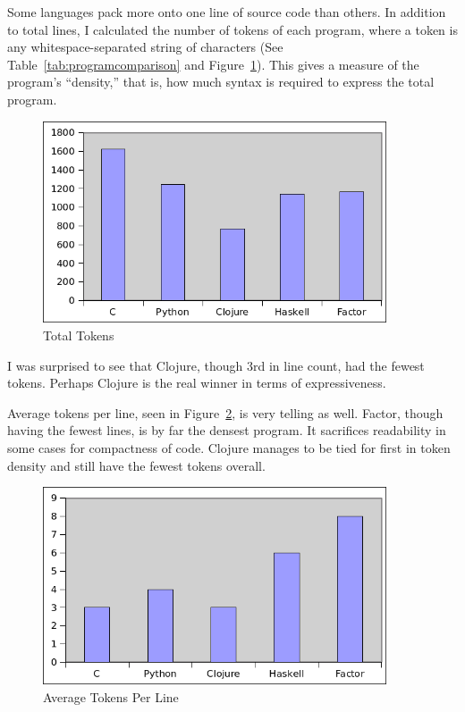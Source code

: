 \documentclass{article}
\begin{document}
Some languages pack more onto one line of source code than others.  In addition
to total lines, I calculated the number of tokens of each program, where a token
is any whitespace-separated string of characters (See
Table~\ref{tab:programcomparison} and Figure~\ref{fig:totaltokens}).  This gives
a measure of the program's ``density,'' that is, how much syntax is required to
express the total program.

\begin{figure}[h]
    \centering
    \includegraphics[width=4in]{graphs/total-tokens.png}
    \caption{Total Tokens \label{fig:totaltokens}}
\end{figure}

I was surprised to see that Clojure, though 3rd in line count, had the fewest
tokens.  Perhaps Clojure is the real winner in terms of expressiveness.

Average tokens per line, seen in Figure~\ref{fig:averagetokens}, is very telling
as well.  Factor, though having the fewest lines, is by far the densest program.
It sacrifices readability in some cases for compactness of code.  Clojure
manages to be tied for first in token density and still have the fewest tokens
overall.

\begin{figure}[h]
    \centering
    \includegraphics[width=4in]{graphs/average-tokens-per-line.png}
    \caption{Average Tokens Per Line \label{fig:averagetokens}}
\end{figure}
\end{document}
